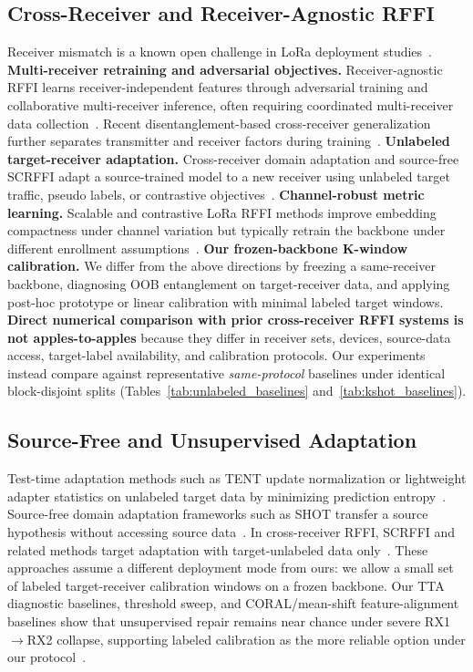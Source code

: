\subsection{Cross-Receiver and Receiver-Agnostic RFFI}
Receiver mismatch is a known open challenge in LoRa deployment studies~\cite{elmaghbub2021lora_wild,alshawabka2020exposing_fingerprint}.
\textbf{Multi-receiver retraining and adversarial objectives.}
Receiver-agnostic RFFI learns receiver-independent features through adversarial training and collaborative multi-receiver inference, often requiring coordinated multi-receiver data collection~\cite{shen2024receiveragnostic,ganin2016domain_adversarial,ma2025receiver_independent_rffi}.
Recent disentanglement-based cross-receiver generalization further separates transmitter and receiver factors during training~\cite{ma2025cross_receiver_disentangle}.
\textbf{Unlabeled target-receiver adaptation.}
Cross-receiver domain adaptation and source-free SCRFFI adapt a source-trained model to a new receiver using unlabeled target traffic, pseudo labels, or contrastive objectives~\cite{yang2024cross_receiver_da,yang2025scrffi,liang2020shot}.
\textbf{Channel-robust metric learning.}
Scalable and contrastive LoRa RFFI methods improve embedding compactness under channel variation but typically retrain the backbone under different enrollment assumptions~\cite{shen2022scalable_lora_rffi,ma2025contrastive_lora_rffi,khosla2020supcon,wen2016center_loss}.
\textbf{Our frozen-backbone K-window calibration.}
We differ from the above directions by freezing a same-receiver backbone, diagnosing OOB entanglement on target-receiver data, and applying post-hoc prototype or linear calibration with minimal labeled target windows.
\textbf{Direct numerical comparison with prior cross-receiver RFFI systems is not apples-to-apples} because they differ in receiver sets, devices, source-data access, target-label availability, and calibration protocols.
Our experiments instead compare against representative \emph{same-protocol} baselines under identical block-disjoint splits (Tables~\ref{tab:unlabeled_baselines} and~\ref{tab:kshot_baselines}).

\subsection{Source-Free and Unsupervised Adaptation}
Test-time adaptation methods such as TENT update normalization or lightweight adapter statistics on unlabeled target data by minimizing prediction entropy~\cite{wang2021tent,lim2023ttn}.
Source-free domain adaptation frameworks such as SHOT transfer a source hypothesis without accessing source data~\cite{liang2020shot,ben2010domain_adaptation}.
In cross-receiver RFFI, SCRFFI and related methods target adaptation with target-unlabeled data only~\cite{yang2025scrffi,yang2024cross_receiver_da}.
These approaches assume a different deployment mode from ours: we allow a small set of labeled target-receiver calibration windows on a frozen backbone.
Our TTA diagnostic baselines, threshold sweep, and CORAL/mean-shift feature-alignment baselines show that unsupervised repair remains near chance under severe RX1$\rightarrow$RX2 collapse, supporting labeled calibration as the more reliable option under our protocol~\cite{sun2016deepcoral,wang2021tent}.

